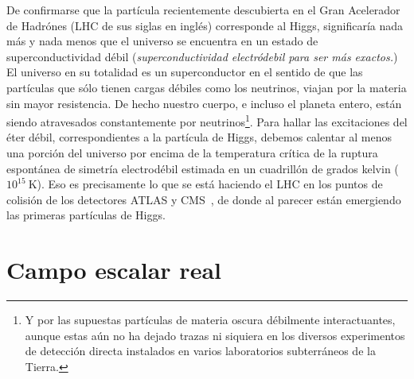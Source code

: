 De confirmarse que la partícula recientemente descubierta en el Gran Acelerador de Hadrónes (LHC de sus siglas en inglés) corresponde al Higgs, significaría nada más y nada menos que el universo se encuentra en un estado de superconductividad débil (\emph{superconductividad electródebil para ser más exactos.}) El universo en su totalidad es un superconductor en el sentido de que las partículas que sólo tienen cargas débiles como los neutrinos, viajan por la materia sin mayor resistencia. De hecho nuestro cuerpo, e incluso el planeta entero, están siendo atravesados constantemente por neutrinos\footnote{Y por las supuestas partículas de materia oscura débilmente interactuantes, aunque estas aún no ha dejado trazas ni siquiera en los diversos experimentos de detección directa instalados en varios laboratorios subterráneos de la Tierra.}. Para hallar las excitaciones del éter débil, correspondientes a la partícula de Higgs, debemos calentar al menos una porción del universo por encima de la temperatura crítica de la ruptura espontánea de simetría electrodébil estimada en un cuadrillón de grados kelvin ($10^{15}\ $K). Eso es precisamente lo que se está haciendo el LHC en los puntos de colisión de los detectores ATLAS y CMS~\cite{quarknet}, de donde al parecer están emergiendo las primeras partículas de Higgs. 

 



\section{Campo escalar real}

